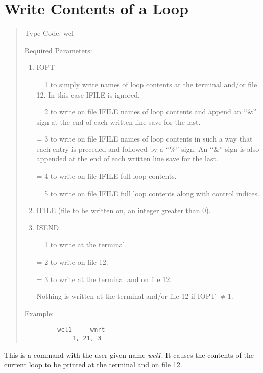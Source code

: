 \section{Write Contents of a Loop}
\begin{quotation}
\noindent Type Code:  wcl 
\vspace{5mm}

\noindent Required Parameters:
\begin{enumerate}
       \item  IOPT

              = 1 to simply write names of loop contents at the terminal
			  and/or file 12.  \linebreak \hspace*{1em} In this case IFILE is ignored.

		  = 2 to write on file IFILE names of loop contents and append an
		    \lq\lq \&'' sign \hspace*{1em}at the end of each written line save
		    for the last.

		  = 3 to write on file IFILE names of loop contents in such a way that each \hspace*{1em}entry is
		    preceded and followed by a \lq\lq \%'' sign.
		    An \lq\lq \&'' sign is also \hspace*{1em}appended at the end of each
		    written line save for the last.

		  = 4 to write on file IFILE full loop contents.

		  = 5 to write on file IFILE full loop contents along with control indices.

       \item  IFILE (file to be written on, an integer greater than 0).
       \item  ISEND

              = 1 to write at the terminal.

              = 2 to write on file 12.

              = 3 to write at the terminal and on file 12.

               Nothing is written at the terminal and/or file 12 if IOPT $\neq 1$.
\end{enumerate}

\vspace{5mm}
\noindent     Example:
\begin{verbatim}
         wcl1     wmrt
             1, 21, 3
\end{verbatim}
\end{quotation}
This is a command with the user given name {\em wcl1}.  It causes the contents of the current loop to be printed at the terminal and on file 12.


